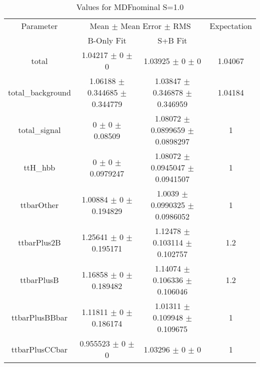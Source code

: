 \begin{table}
\centering
\caption{Values for MDFnominal S=1.0}
\begin{tabular}{cccc}
\toprule
Parameter & \multicolumn{2}{c}{Mean $\pm$ Mean Error $\pm$ RMS} & Expectation\\
 & B-Only Fit & S+B Fit & \\
\midrule
total & \num{1.04217} $\pm$ \num{0} $\pm$ \num{0} & \num{1.03925} $\pm$ \num{0} $\pm$ \num{0} & \num{1.04067}\\
total\_background & \num{1.06188} $\pm$ \num{0.344685} $\pm$ \num{0.344779} & \num{1.03847} $\pm$ \num{0.346878} $\pm$ \num{0.346959} & \num{1.04184}\\
total\_signal & \num{0} $\pm$ \num{0} $\pm$ \num{0.08509} & \num{1.08072} $\pm$ \num{0.0899659} $\pm$ \num{0.0898297} & \num{1}\\
ttH\_hbb & \num{0} $\pm$ \num{0} $\pm$ \num{0.0979247} & \num{1.08072} $\pm$ \num{0.0945047} $\pm$ \num{0.0941507} & \num{1}\\
ttbarOther & \num{1.00884} $\pm$ \num{0} $\pm$ \num{0.194829} & \num{1.0039} $\pm$ \num{0.0990325} $\pm$ \num{0.0986052} & \num{1}\\
ttbarPlus2B & \num{1.25641} $\pm$ \num{0} $\pm$ \num{0.195171} & \num{1.12478} $\pm$ \num{0.103114} $\pm$ \num{0.102757} & \num{1.2}\\
ttbarPlusB & \num{1.16858} $\pm$ \num{0} $\pm$ \num{0.189482} & \num{1.14074} $\pm$ \num{0.106336} $\pm$ \num{0.106046} & \num{1.2}\\
ttbarPlusBBbar & \num{1.11811} $\pm$ \num{0} $\pm$ \num{0.186174} & \num{1.01311} $\pm$ \num{0.109948} $\pm$ \num{0.109675} & \num{1}\\
ttbarPlusCCbar & \num{0.955523} $\pm$ \num{0} $\pm$ \num{0} & \num{1.03296} $\pm$ \num{0} $\pm$ \num{0} & \num{1}\\
\bottomrule
\end{tabular}
\end{table}
